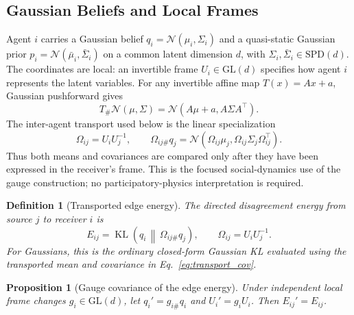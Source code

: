 \documentclass[12pt]{article}
\newcommand{\KL}{\operatorname{KL}}
\newtheorem{proposition}[theorem]{Proposition}
\newtheorem{definition}[theorem]{Definition}
\begin{document}
\subsection{Gaussian Beliefs and Local Frames}

Agent $i$ carries a Gaussian belief $q_i=\mathcal N(\mu_i,\Sigma_i)$ and a quasi-static Gaussian prior $p_i=\mathcal N(\bar\mu_i,\bar\Sigma_i)$ on a common latent dimension $d$, with $\Sigma_i,\bar\Sigma_i\in\mathrm{SPD}(d)$. The coordinates are local: an invertible frame $U_i\in\mathrm{GL}(d)$ specifies how agent $i$ represents the latent variables. For any invertible affine map $T(x)=Ax+a$, Gaussian pushforward gives
\begin{equation}
T_{\#}\mathcal N(\mu,\Sigma)
=\mathcal N(A\mu+a,A\Sigma A^{\top}).
\label{eq:affine_gaussian_pushforward}
\end{equation}
The inter-agent transport used below is the linear specialization
\begin{equation}
\Omega_{ij}=U_iU_j^{-1},
\qquad
\Omega_{ij\#}q_j
=\mathcal N(\Omega_{ij}\mu_j,\Omega_{ij}\Sigma_j\Omega_{ij}^{\top}).
\label{eq:transport_cov}
\end{equation}
Thus both means and covariances are compared only after they have been expressed in the receiver's frame. This is the focused social-dynamics use of the gauge construction; no participatory-physics interpretation is required.

\begin{definition}[Transported edge energy]
The directed disagreement energy from source $j$ to receiver $i$ is
\begin{equation}
E_{ij}=\KL\!\left(q_i\,\middle\|\,\Omega_{ij\#}q_j\right),
\qquad
\Omega_{ij}=U_iU_j^{-1}.
\label{eq:transported_edge_energy}
\end{equation}
For Gaussians, this is the ordinary closed-form Gaussian KL evaluated using the transported mean and covariance in Eq.~\eqref{eq:transport_cov}.
\end{definition}

\begin{proposition}[Gauge covariance of the edge energy]
Under independent local frame changes $g_i\in\mathrm{GL}(d)$, let $q_i'=g_{i\#}q_i$ and $U_i'=g_iU_i$. Then $E_{ij}'=E_{ij}$.
\end{proposition}
\end{document}
